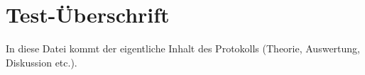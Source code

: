 \section{Test-Überschrift}
In diese Datei kommt der eigentliche Inhalt des Protokolls (Theorie, Auswertung, Diskussion etc.).
